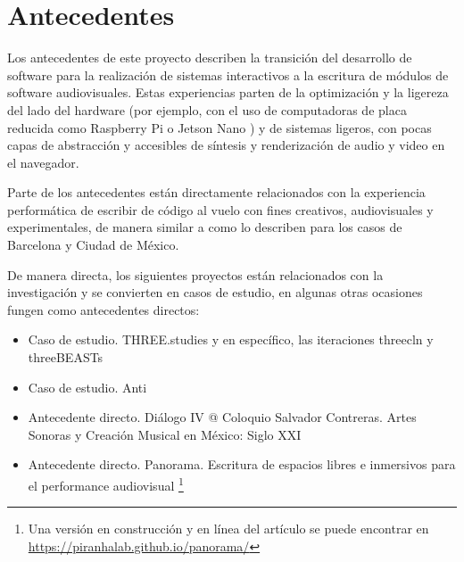 
\section*{Antecedentes}


Los antecedentes de este proyecto describen la transición del desarrollo de software para la realización de sistemas interactivos a la escritura de módulos de software audiovisuales. Estas experiencias parten de la optimización y la ligereza del lado del hardware (por ejemplo, con el uso de computadoras de placa reducida como Raspberry Pi o Jetson Nano ) y de sistemas ligeros, con pocas capas de abstracción y accesibles de síntesis y renderización de audio y video en el navegador.

Parte de los antecedentes están directamente relacionados con la experiencia performática de escribir de código al vuelo con fines creativos, audiovisuales y experimentales, de manera similar a como lo describen \cite{villasenor} para los casos de Barcelona y Ciudad de México. 


De manera directa, los siguientes proyectos están relacionados con la investigación y se convierten en casos de estudio, en algunas otras ocasiones fungen como antecedentes directos:

\begin{itemize}

\item Caso de estudio. THREE.studies \citep{threestudies} y en específico, las iteraciones threecln \citep{threecln} y threeBEASTs \citep{threeBEASTs}
\item Caso de estudio. Anti \citep{anti} 
\item Antecedente directo. Diálogo IV @ Coloquio Salvador Contreras. Artes Sonoras y Creación Musical en México: Siglo XXI \citep{dialogo}
\item Antecedente directo. Panorama. Escritura de espacios libres e inmersivos para el performance audiovisual \citep{PanoramaArticulo}\footnote{Una versión en construcción y en línea del artículo se puede encontrar en \url{https://piranhalab.github.io/panorama/}}
  
\end{itemize}


